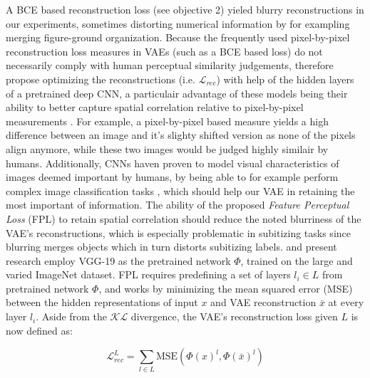 \documentclass[twocolumn]{article}
\begin{document}
A BCE based reconstruction loss (see objective 2) yieled blurry reconstructions in our experiments, sometimes distorting numerical information by for exampling merging figure-ground organization.
Because the frequently used pixel-by-pixel reconstruction loss measures
in VAEs (such as a BCE based loss) do not necessarily comply with human perceptual similarity
judgements, \citet{hou2017deep} therefore propose optimizing the reconstructions (i.e. \(\mathcal{L}_{rec}\)) with help of the hidden layers of a pretrained deep CNN, a particulair advantage of these models being their ability to better capture spatial correlation relative to pixel-by-pixel measurements \citep{hou2017deep}. For example, a pixel-by-pixel based measure yields a high difference between an image and it's slighty shifted version as none of the pixels align anymore, while these two images would be judged highly similair by humans.
Additionally, CNNs haven proven to model visual characteristics of
images deemed important by humans, by being able to for example perform
complex image classification tasks \citep{krizhevsky2012imagenet}, which should help our VAE in retaining the most important of information.  The ability
of the proposed \emph{Feature Perceptual Loss} (FPL) to retain spatial
correlation should reduce the noted blurriness
\citep[see for example]{larsen2015autoencoding} of the VAE's reconstructions, which is
especially problematic in subitizing tasks since blurring merges objects
which in turn distorts subitizing labels. \citet{hou2017deep} and
present research employ VGG-19 \citep{simonyan2014very} as the
pretrained network \(\Phi\), trained on the large and varied ImageNet
\citep{russakovsky2015imagenet} dataset. FPL requires predefining a set
of layers \(l_i \in L\) from pretrained network \(\Phi\), and works by
minimizing the mean squared error (MSE) between the hidden
representations of input \(x\) and VAE reconstruction \(\bar{x}\) at
every layer \(l_i\). Aside from the \(\mathcal{KL}\) divergence, the
VAE's reconstruction loss given $L$ is now defined as:

\[ \mathcal{L}^{L}_{rec} = \sum_{l \in L}^{} \textrm{MSE}(\Phi(x)^{l}, \Phi(\bar{x})^{l})\]
\end{document}
